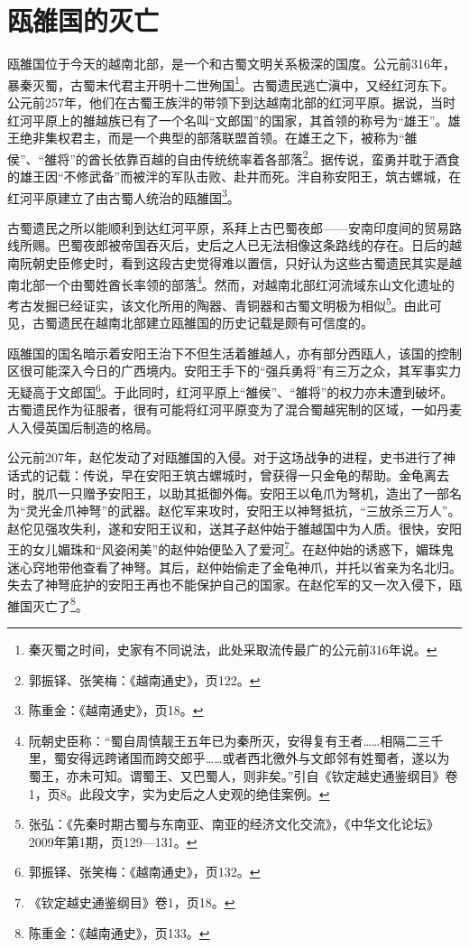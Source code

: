 \section{瓯雒国的灭亡}

\indent 瓯雒国位于今天的越南北部，是一个和古蜀文明关系极深的国度。公元前316年，暴秦灭蜀，古蜀末代君主开明十二世殉国\footnote{秦灭蜀之时间，史家有不同说法，此处采取流传最广的公元前316年说。}。古蜀遗民逃亡滇中，又经红河东下。公元前257年，他们在古蜀王族泮的带领下到达越南北部的红河平原。据说，当时红河平原上的雒越族已有了一个名叫“文郎国”的国家，其首领的称号为“雄王”。雄王绝非集权君主，而是一个典型的部落联盟首领。在雄王之下，被称为“雒侯”、“雒将”的酋长依靠百越的自由传统统率着各部落\footnote{郭振铎、张笑梅：《越南通史》，页122。}。据传说，蛮勇并耽于酒食的雄王因“不修武备”而被泮的军队击败、赴井而死。泮自称安阳王，筑古螺城，在红河平原建立了由古蜀人统治的瓯雒国\footnote{陈重金：《越南通史》，页18。}。

古蜀遗民之所以能顺利到达红河平原，系拜上古巴蜀夜郎——安南印度间的贸易路线所赐。巴蜀夜郎被帝国吞灭后，史后之人已无法相像这条路线的存在。日后的越南阮朝史臣修史时，看到这段古史觉得难以置信，只好认为这些古蜀遗民其实是越南北部一个由蜀姓酋长率领的部落\footnote{阮朝史臣称：“蜀自周慎靓王五年已为秦所灭，安得复有王者……相隔二三千里，蜀安得远跨诸国而跨交郎乎……或者西北徼外与文郎邻有姓蜀者，遂以为蜀王，亦未可知。谓蜀王、又巴蜀人，则非矣。”引自《钦定越史通鉴纲目》卷1，页8。此段文字，实为史后之人史观的绝佳案例。}。然而，对越南北部红河流域东山文化遗址的考古发掘已经证实，该文化所用的陶器、青铜器和古蜀文明极为相似\footnote{张弘：《先秦时期古蜀与东南亚、南亚的经济文化交流》，《中华文化论坛》2009年第1期，页129—131。}。由此可见，古蜀遗民在越南北部建立瓯雒国的历史记载是颇有可信度的。

瓯雒国的国名暗示着安阳王治下不但生活着雒越人，亦有部分西瓯人，该国的控制区很可能深入今日的广西境内。安阳王手下的“强兵勇将”有三万之众，其军事实力无疑高于文郎国\footnote{郭振铎、张笑梅：《越南通史》，页132。}。于此同时，红河平原上“雒侯”、“雒将”的权力亦未遭到破坏。古蜀遗民作为征服者，很有可能将红河平原变为了混合蜀越宪制的区域，一如丹麦人入侵英国后制造的格局。 

公元前207年，赵佗发动了对瓯雒国的入侵。对于这场战争的进程，史书进行了神话式的记载：传说，早在安阳王筑古螺城时，曾获得一只金龟的帮助。金龟离去时，脱爪一只赠予安阳王，以助其抵御外侮。安阳王以龟爪为弩机，造出了一部名为“灵光金爪神弩”的武器。赵佗军来攻时，安阳王以神弩抵抗，“三放杀三万人”。赵佗见强攻失利，遂和安阳王议和，送其子赵仲始于雒越国中为人质。很快，安阳王的女儿媚珠和“风姿闲美”的赵仲始便坠入了爱河\footnote{《钦定越史通鉴纲目》卷1，页18。}。在赵仲始的诱惑下，媚珠鬼迷心窍地带他查看了神弩。其后，赵仲始偷走了金龟神爪，并托以省亲为名北归。失去了神弩庇护的安阳王再也不能保护自己的国家。在赵佗军的又一次入侵下，瓯雒国灭亡了\footnote{陈重金：《越南通史》，页133。}。

